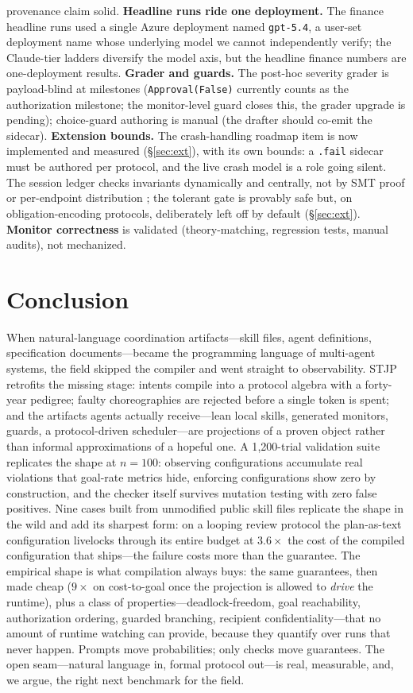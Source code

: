 \documentclass{article}
\newcommand{\stjp}{\textsc{STJP}}
\begin{document}
provenance claim solid. \textbf{Headline runs ride one deployment.} The finance headline runs used a single Azure deployment named \texttt{gpt-5.4}, a user-set deployment name whose underlying model we cannot independently verify; the Claude-tier ladders diversify the model axis, but the headline finance numbers are one-deployment results. \textbf{Grader and guards.} The post-hoc severity grader is payload-blind at milestones (\texttt{Approval(False)} currently counts as the authorization milestone; the monitor-level guard closes this, the grader upgrade is pending); choice-guard authoring is manual (the drafter should co-emit the sidecar). \textbf{Extension bounds.} The crash-handling roadmap item is now implemented and measured (\S\ref{sec:ext}), with its own bounds: a \texttt{.fail} sidecar must be authored per protocol, and the live crash model is a role going silent. The session ledger checks invariants dynamically and centrally, not by SMT proof or per-endpoint distribution \citep{chen12}; the tolerant gate is provably safe but, on obligation-encoding protocols, deliberately left off by default (\S\ref{sec:ext}). \textbf{Monitor correctness} is validated (theory-matching, regression tests, manual audits), not mechanized.

\section{Conclusion}\label{sec:conc}
When natural-language coordination artifacts---skill files, agent definitions, specification documents---became the programming language of multi-agent systems, the field skipped the compiler and went straight to observability. \stjp{} retrofits the missing stage: intents compile into a protocol algebra with a forty-year pedigree; faulty choreographies are rejected before a single token is spent; and the artifacts agents actually receive---lean local skills, generated monitors, guards, a protocol-driven scheduler---are projections of a proven object rather than informal approximations of a hopeful one. A 1{,}200-trial validation suite replicates the shape at $n{=}100$: observing configurations accumulate real violations that goal-rate metrics hide, enforcing configurations show zero by construction, and the checker itself survives mutation testing with zero false positives. Nine cases built from unmodified public skill files replicate the shape in the wild and add its sharpest form: on a looping review protocol the plan-as-text configuration livelocks through its entire budget at $3.6\times$ the cost of the compiled configuration that ships---the failure costs more than the guarantee. The empirical shape is what compilation always buys: the same guarantees, then made cheap ($9\times$ on cost-to-goal once the projection is allowed to \emph{drive} the runtime), plus a class of properties---deadlock-freedom, goal reachability, authorization ordering, guarded branching, recipient confidentiality---that no amount of runtime watching can provide, because they quantify over runs that never happen. Prompts move probabilities; only checks move guarantees. The open seam---natural language in, formal protocol out---is real, measurable, and, we argue, the right next benchmark for the field.
\end{document}
